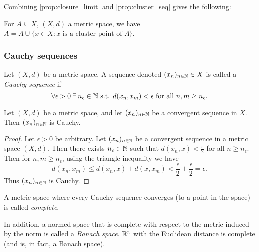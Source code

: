 \documentclass{article}
\begin{document}
Combining \cref{prop:closure_limit} and \cref{prop:cluster_seq} gives the following: 

\begin{corollary}
For $A \subseteq X$, $(X,d)$ a metric space, we have $\overline{A} = A \cup \{x \in X : x \text{ is a cluster point of }A \}$.
\end{corollary}

\subsubsection{Cauchy sequences}

\begin{definition}
Let $(X,d)$ be a metric space. A sequence denoted $(x_n)_{n \in {\mathbb{N}}} \in X$ is called a \emph{Cauchy sequence} if
\begin{equation*}
    \forall \epsilon >0  \; \exists \, n_\epsilon \in {\mathbb{N}} \text{ s.t. } d(x_n,x_m) < \epsilon \text{ for all } n,m \geq n_\epsilon .
\end{equation*}
\end{definition}

\begin{proposition}
\label{prop:converge_means_Cauchy}
Let $(X, d)$ be a metric space, and let $(x_n)_{n\in{\mathbb{N}}}$ be a convergent sequence in $X$. Then  $(x_n)_{n\in{\mathbb{N}}}$ is Cauchy.
\end{proposition}

\begin{proof}
Let $\epsilon > 0$ be arbitrary. Let $(x_n)_{n\in{\mathbb{N}}}$ be a convergent sequence in a metric space $(X,d)$. Then there exists $n_\epsilon \in {\mathbb{N}}$ such that $d(x_n,x) < \frac{\epsilon}{2}$ for all $n \geq n_\epsilon$. Then for $n,m \geq n_\epsilon$, using the triangle inequality we have
\begin{equation*}
    d(x_n,x_m) \leq  d(x_n,x) +  d(x,x_m) < \frac{\epsilon}{2} + \frac{\epsilon}{2} = \epsilon .
\end{equation*}
Thus $(x_n)_{n\in{\mathbb{N}}}$ is Cauchy.
\end{proof}

\begin{definition}
A metric space where every Cauchy sequence converges (to a point in the space) is called \emph{complete}.
\end{definition}

In addition, a normed space that is complete with respect to the metric induced by the norm is called a \emph{Banach space}. ${\mathbb{R}}^n$ with the Euclidean distance is complete (and is, in fact, a Banach space). 
\end{document}
